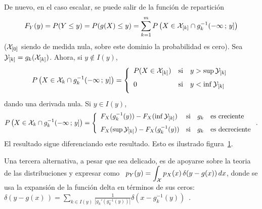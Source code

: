 De nuevo, en el caso escalar, se puede salir de la funci\'on de repartici\'on
%
\[
F_Y(y) =  P(Y \le y) = P(  g(X) \le y )  = \sum_{k=1}^m P\left( X  \in \mathcal{X}_{[k]} \cap
  g_k^{-1}(-\infty \, ; \, y] \right)
\]
%
($\mathcal{X}_{[0]}$  siendo  de medida  nula,  sobre  este  dominio la  probabilidad  es
cero). Sea $\mathcal{Y}_{[k]} = g_k(\mathcal{X}_{[k]})$. Ahora, si $y \not\in I(y)$,
%
\[
P\left(   X   \in  \X_k   \cap   g_k^{-1}(-\infty  \;   y]  \right)   =
\left\{\begin{array}{lll}
%
P(X \in \X_{[k]}) & \mbox{si} & y > \sup \Y_{[k]}\\[2.5mm]
%
0 & \mbox{si} & y < \inf \Y_{[k]}\\[2.5mm]
\end{array}\right.
\]
%
dando una derivada nula. Si $y \in I(y)$,
%
\[
P\left(   X   \in  \X_k   \cap   g_k^{-1}(-\infty  \;   y]  \right)   =
\left\{\begin{array}{lll}
%
F_X(g_k^{-1}(y)) - F_X(\inf \Y_{[k]}) & \mbox{si} & g_k \quad \mbox{es creciente}\\[2.5mm]
%
F_X(\sup \Y_{[k]}) - F_X(g_k^{-1}(y))  & \mbox{si} & g_k \quad \mbox{es decreciente}
\end{array}\right..
\]
%
El   resultado   sigue  diferenciando   este   resultado.   Esto  es   ilustrado
figura~\ref{Fig:MP:TransformacionVA}.

\begin{figure}[h!]
\begin{center}  \end{center}
%
\label{Fig:MP:TransformacionVA}
\end{figure}

Una  tercera alternativa,  a pesar  que sea  delicado, es  de apoyarse  sobre la
teoria de las  distribuciones y expresar como \  $\displaystyle p_Y(y) = \int_{\mathcal{X}}
p_X(x) \,  \delta(y-g(x)) \, dx$,  donde se usa  la expansi\'on de  la funci\'on
delta  en  t\'erminos de  sus  ceros:  \  $\delta(y-g(x)\,)= \sum_{k  \in  I(y)}
\frac{1}{\left|      g_k'\left(      g_k^{-1}      (y)     \right)      \right|}
\delta(x-g_k^{-1}(y))$~\cite{ManWol95}.

